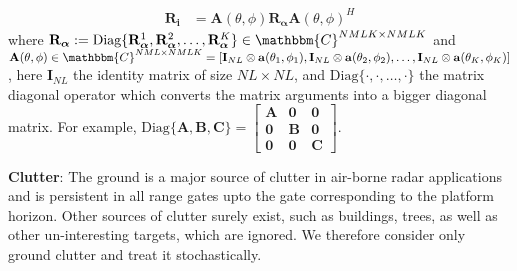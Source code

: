 \documentclass[11pt,draftclsnofoot,onecolumn]{IEEEtran}
\theoremstyle{definition}
\theoremstyle{remark}
\begin{document}
\begin{align} \label{eq13}
\mathbf{R_i}&= \mathbf{A}(\theta,\phi)\mathbf{R}_{\boldsymbol{\alpha}}\mathbf{A}(\theta,\phi)^H
\end{align}
where $\mathbf{R}_{\boldsymbol{\alpha}}:=\mbox{Diag}\{\mathbf{R}_{\boldsymbol{\alpha}}^1,\mathbf{R}_{\boldsymbol{\alpha}}^2,\ldots,\mathbf{R}_{\boldsymbol{\alpha}}^K\} \in\mathbbm{C}^{NMLK\times NMLK}$ and $\mathbf{A}(\theta,\phi)\in\mathbbm{C}^{NML\times NMLK}\\
=[\mathbf{I}_{NL}\otimes \mathbf{a}(\theta_1,\phi_1),\mathbf{I}_{NL}\otimes \mathbf{a}(\theta_2,\phi_2),\ldots,\mathbf{I}_{NL}\otimes \mathbf{a}(\theta_K,\phi_K)]$, 
here $\mathbf{I}_{NL}$ the identity matrix of size $NL\times NL$, and $\mbox{Diag}\{ \cdot,\cdot,\ldots,\cdot\}$ the matrix diagonal operator which converts the matrix arguments into a bigger diagonal matrix. For example, $\mbox{Diag}\{\mathbf{A,B,C}\}=\left[ \begin{smallmatrix} \mathbf{A}&\mathbf{0}&\mathbf{0}\\
\mathbf{0}&\mathbf{B}&\mathbf{0} \\ \mathbf{0}&\mathbf{0}&\mathbf{C} \end{smallmatrix} \right].$

{\bf Clutter}: The ground is a major source of clutter in air-borne radar applications and is persistent in all range gates upto the gate corresponding to the platform horizon. Other sources of clutter surely exist, such as buildings, trees, as well as other un-interesting targets, which are ignored. We therefore consider only  ground clutter and treat it stochastically.
\end{document}
